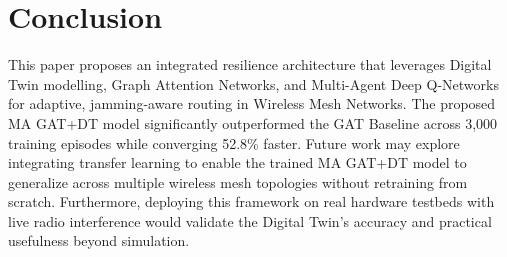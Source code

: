 \documentclass[conference]{IEEEtran}
\begin{document}
\section{Conclusion}

This paper proposes an integrated resilience architecture that leverages Digital Twin modelling, Graph Attention Networks, and Multi-Agent Deep Q-Networks for adaptive, jamming-aware routing in Wireless Mesh Networks. The proposed MA GAT+DT model significantly outperformed the GAT Baseline across 3,000 training episodes while converging 52.8\% faster.
Future work may explore integrating transfer learning to enable the trained MA GAT+DT model to generalize across multiple wireless mesh topologies without retraining from scratch. Furthermore, deploying this framework on real hardware testbeds with live radio interference would validate the Digital Twin's accuracy and practical usefulness beyond simulation.
\end{document}
